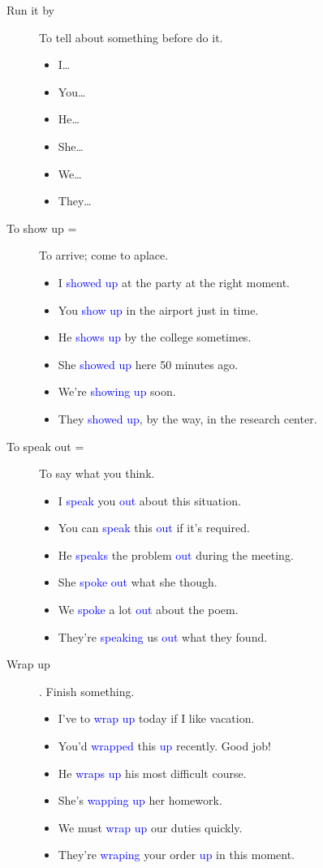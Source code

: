 \begin{multicols}{2}
\begin{description}
\item[Run it by] To tell about something before do it.
\begin{itemize}
\item I\dots 
\item You\dots 
\item He\dots
\item She\dots
\item We\dots
\item They\dots
\end{itemize}

\item [To show up =] To arrive; come to aplace.
\begin{itemize}
\item I \textcolor{blue}{showed up} at the party at the right moment.
\item You \textcolor{blue}{show up} in the airport just in time.
\item He \textcolor{blue}{shows up} by the college sometimes.
\item She \textcolor{blue}{showed up} here 50 minutes ago.
\item We're \textcolor{blue}{showing up} soon.
\item They \textcolor{blue}{showed up}, by the way, in the research center.
\end{itemize}
\item [To speak out =] To say what you think.
\begin{itemize}
\item I \textcolor{blue}{speak} you \textcolor{blue}{out} about this situation.
\item You can \textcolor{blue}{speak} this \textcolor{blue}{out} if it's required.
\item He \textcolor{blue}{speaks} the problem \textcolor{blue}{out} during the meeting.
\item She \textcolor{blue}{spoke out} what she though.
\item We \textcolor{blue}{spoke} a lot \textcolor{blue}{out} about the poem.
\item They're \textcolor{blue}{speaking} us \textcolor{blue}{out} what they found.
\end{itemize}

\item [Wrap up]. Finish something.
\begin{itemize}
\item I've to \textcolor{blue}{wrap up} today if I like vacation.
\item You'd \textcolor{blue}{wrapped} this \textcolor{blue}{up} recently. Good job!
\item He \textcolor{blue}{wraps up} his most difficult course.
\item She's \textcolor{blue}{wapping up} her homework.
\item We must \textcolor{blue}{wrap up} our duties quickly.
\item They're \textcolor{blue}{wraping} your order \textcolor{blue}{up} in this moment.
\end{itemize}


\end{description}
\end{multicols}
